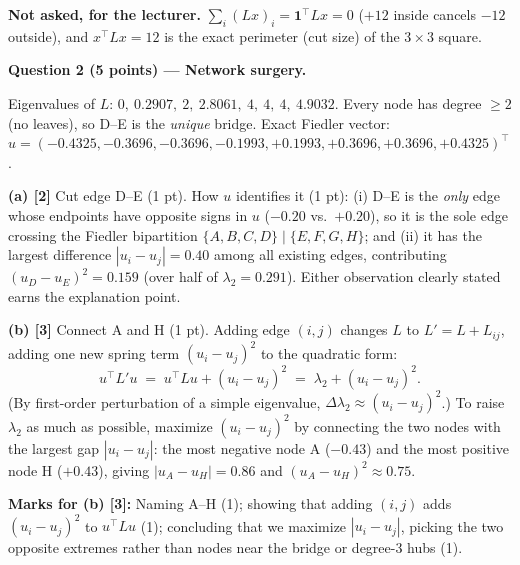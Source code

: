 \documentclass[a4paper, 11pt]{extarticle}
\renewcommand{\question}[3]{\vspace{0.25em}
  {\large\bfseries Question #1 \quad\normalsize\mdseries (#2 points) --- #3}\par
  \vspace{-0.3em}{\color{rulegrey}\rule{\textwidth}{0.6pt}}\par\vspace{0.1em}}
\newcommand{\ans}[1]{{\color{pltblue}#1}}
\begin{document}
\textbf{Not asked, for the lecturer.} $\sum_i (Lx)_i = \mathbf{1}^\top L x = 0$ ($+12$ inside cancels $-12$ outside), and $x^\top L x = 12$ is the exact perimeter (cut size) of the $3\times 3$ square.

\question{2}{5}{Network surgery.}

Eigenvalues of $L$: $0,\ 0.2907,\ 2,\ 2.8061,\ 4,\ 4,\ 4,\ 4.9032$. Every node has degree $\ge 2$ (no leaves), so D--E is the \emph{unique} bridge.
Exact Fiedler vector: $u = (-0.4325,\allowbreak -0.3696,\allowbreak -0.3696,\allowbreak -0.1993,\allowbreak +0.1993,\allowbreak +0.3696,\allowbreak +0.3696,\allowbreak +0.4325)^\top$.

\textbf{(a) [2]} Cut edge \ans{D--E} (1 pt). How $u$ identifies it (1 pt):
(i) D--E is the \emph{only} edge whose endpoints have opposite signs in $u$ ($-0.20$ vs.\ $+0.20$), so it is the sole edge crossing the Fiedler bipartition $\{A,B,C,D\} \mid \{E,F,G,H\}$; and
(ii) it has the largest difference $|u_i - u_j| = 0.40$ among all existing edges, contributing $(u_D - u_E)^2 = 0.159$ (over half of $\lambda_2 = 0.291$). Either observation clearly stated earns the explanation point.

\textbf{(b) [3]} Connect \ans{A and H} (1 pt). Adding edge $(i,j)$ changes $L$ to $L' = L + L_{ij}$, adding one new spring term $(u_i - u_j)^2$ to the quadratic form:
\[
  u^\top L' u \;=\; u^\top L u + (u_i - u_j)^2 \;=\; \lambda_2 + (u_i - u_j)^2 .
\]
(By first-order perturbation of a simple eigenvalue, $\Delta\lambda_2 \approx (u_i - u_j)^2$.) To raise $\lambda_2$ as much as possible, maximize $(u_i - u_j)^2$ by connecting the two nodes with the largest gap $|u_i - u_j|$: the most negative node A ($-0.43$) and the most positive node H ($+0.43$), giving $|u_A - u_H| = 0.86$ and $(u_A - u_H)^2 \approx 0.75$.

\textbf{Marks for (b) [3]:} Naming A--H (1); showing that adding $(i,j)$ adds $(u_i - u_j)^2$ to $u^\top L u$ (1); concluding that we maximize $|u_i - u_j|$, picking the two opposite extremes rather than nodes near the bridge or degree-3 hubs (1).
\end{document}
